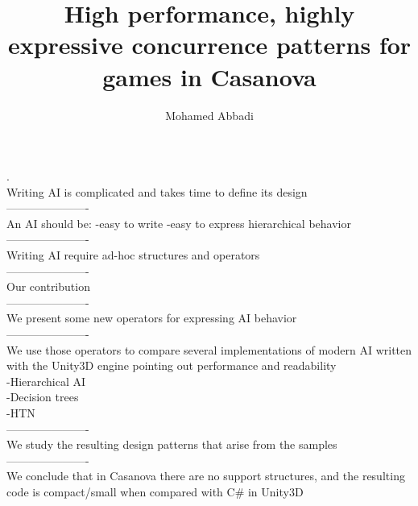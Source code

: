 \documentclass[10pt,a4paper]{article}
\author{Mohamed Abbadi}
\title{High performance, highly expressive concurrence patterns for games in Casanova}
\date{}
\begin{document}
\maketitle
.\\
Writing AI is complicated and takes time to define its design
\\----------------------\\
An AI should be:
-easy to write
-easy to express hierarchical behavior
\\----------------------\\
Writing AI require ad-hoc structures and operators
\\----------------------\\
Our contribution
\\----------------------\\
We present some new operators for expressing AI behavior
\\----------------------\\
We use those operators to compare several implementations of modern AI written with the Unity3D engine pointing out performance and readability\\
-Hierarchical AI\\
-Decision trees\\
-HTN
\\----------------------\\
We study the resulting design patterns that arise from the samples
\\----------------------\\
We conclude that in Casanova there are no support structures, and the resulting code is compact/small when compared with C\# in Unity3D
\end{document}
